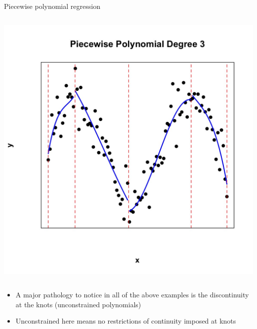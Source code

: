 \documentclass[english]{beamer}
\newcommand{\alertblue}[1]{{\color{blue}#1}}
\begin{document}
\begin{frame}{Piecewise polynomial regression}
\begin{columns}
\begin{column}{0.47\textwidth}
            \includegraphics[width=\linewidth]{images/piecewise_degree_3.jpeg} 
        \end{column}
    \end{columns}  
    \begin{itemize}
        \item A major pathology to notice in all of the above examples is the \alertblue{discontinuity} at the knots (\alertblue{unconstrained polynomials}) 
        \item Unconstrained here means \alertblue{no restrictions of continuity imposed} at knots
    \end{itemize}
\end{frame}
\end{document}
